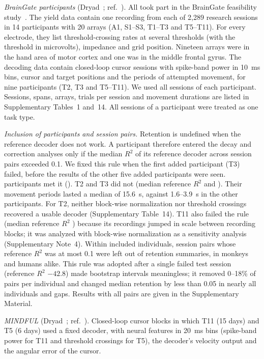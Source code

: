 \documentclass{iopjournal}
\begin{document}
\textit{BrainGate participants} (Dryad~\cite{data_braingate}; ref.~\cite{hahn2026}). All took part in the BrainGate
feasibility study~\cite{rubin2023}. The yield data contain one recording
from each of 2,289 research sessions in 14 participants with 20 arrays (A1, S1--S3, T1--T3 and T5--T11). For every
electrode, they list threshold-crossing rates at several thresholds (with the threshold in microvolts), impedance and
grid position. Nineteen arrays were in the hand area of motor cortex and one was in the middle frontal gyrus. The
decoding data contain closed-loop cursor sessions with spike-band power in 10~ms bins, cursor and target positions and
the periods of attempted movement, for nine participants (T2, T3 and T5--T11). We used all sessions of each
participant. Sessions, spans, arrays, trials per session and movement durations are listed in Supplementary Tables~1
and~14.
All sessions of a participant were treated as one task type.

\textit{Inclusion of participants and session pairs.} Retention is undefined when the reference decoder does not work.
A participant therefore entered the decay and correction analyses only if the median $R^2$ of its reference decoder
across session pairs exceeded 0.1. We fixed this rule when the first added participant (T3) failed, before the results
of the other five added participants were seen.  participants met it (). T2 and T3
did not (median reference $R^2$  and ). Their movement periods lasted a median of 15.6~s,
against 1.6--3.9~s in the other participants. For T2, neither block-wise normalization nor threshold crossings
recovered a usable decoder (Supplementary Table~14). T11 also failed the rule (median reference $R^2$ ) because its
recordings jumped in scale between recording blocks; it was analyzed with block-wise normalization as a sensitivity
analysis (Supplementary Note~4). Within included individuals, session pairs whose reference $R^2$ was at most 0.1
were left out of retention summaries, in monkeys and humans alike. This rule was adopted after a single failed test
session (reference $R^2$ $-42.8$) made bootstrap intervals meaningless; it removed 0--18\% of pairs per individual and
changed median retention by less than 0.05 in nearly all individuals and gaps. Results with all pairs are given in the
Supplementary Material.

\textit{MINDFUL} (Dryad~\cite{data_mindful}; ref.~\cite{pun2024}). Closed-loop cursor blocks in which T11 (15 days) and T5
(6 days) used a fixed decoder, with neural features in 20~ms bins (spike-band power for T11 and threshold crossings for
T5), the decoder's velocity output and the angular error of the cursor.
\end{document}
